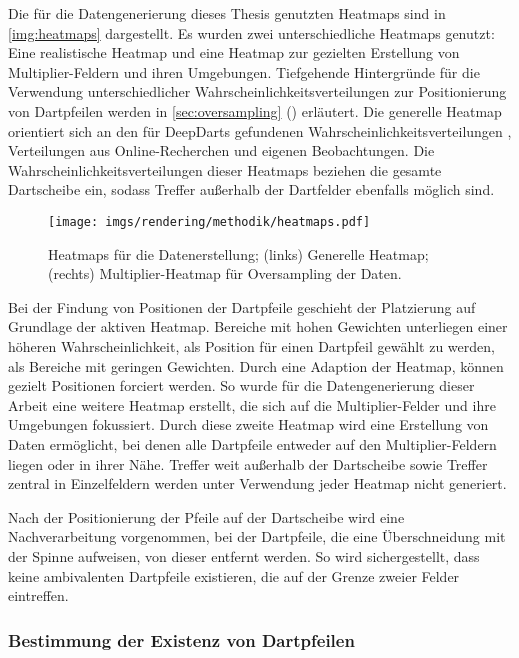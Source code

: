 Die für die Datengenerierung dieses Thesis genutzten Heatmaps sind in \autoref{img:heatmaps} dargestellt. Es wurden zwei unterschiedliche Heatmaps genutzt: Eine realistische Heatmap und eine Heatmap zur gezielten Erstellung von Multiplier-Feldern und ihren Umgebungen. Tiefgehende Hintergründe für die Verwendung unterschiedlicher Wahrscheinlichkeitsverteilungen zur Positionierung von Dartpfeilen werden in \autoref{sec:oversampling} () erläutert. Die generelle Heatmap orientiert sich an den für DeepDarts gefundenen Wahrscheinlichkeitsverteilungen \cite{deepdarts}, Verteilungen aus Online-Recherchen \cite{heatmap} und eigenen Beobachtungen. Die Wahrscheinlichkeitsverteilungen dieser Heatmaps beziehen die gesamte Dartscheibe ein, sodass Treffer außerhalb der Dartfelder ebenfalls möglich sind.

\begin{figure}
    \centering
    \texttt{[image: imgs/rendering/methodik/heatmaps.pdf]}
    \caption{Heatmaps für die Datenerstellung; (links) Generelle Heatmap; (rechts) Multiplier-Heatmap für Oversampling der Daten.}
    \label{img:heatmaps}
\end{figure}

Bei der Findung von Positionen der Dartpfeile geschieht der Platzierung auf Grundlage der aktiven Heatmap. Bereiche mit hohen Gewichten unterliegen einer höheren Wahrscheinlichkeit, als Position für einen Dartpfeil gewählt zu werden, als Bereiche mit geringen Gewichten. Durch eine Adaption der Heatmap, können gezielt Positionen forciert werden. So wurde für die Datengenerierung dieser Arbeit eine weitere Heatmap erstellt, die sich auf die Multiplier-Felder und ihre Umgebungen fokussiert. Durch diese zweite Heatmap wird eine Erstellung von Daten ermöglicht, bei denen alle Dartpfeile entweder auf den Multiplier-Feldern liegen oder in ihrer Nähe. Treffer weit außerhalb der Dartscheibe sowie Treffer zentral in Einzelfeldern werden unter Verwendung jeder Heatmap nicht generiert.

Nach der Positionierung der Pfeile auf der Dartscheibe wird eine Nachverarbeitung vorgenommen, bei der Dartpfeile, die eine Überschneidung mit der Spinne aufweisen, von dieser entfernt werden. So wird sichergestellt, dass keine ambivalenten Dartpfeile existieren, die auf der Grenze zweier Felder eintreffen.

\subsubsection{Bestimmung der Existenz von Dartpfeilen}
\label{sec:dartpfeile_existenz}

